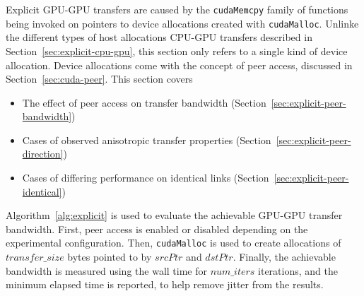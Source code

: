 Explicit GPU-GPU transfers are caused by the \texttt{cudaMemcpy} family of functions being invoked on pointers to device allocations created with \texttt{cudaMalloc}.
Unlinke the different types of host allocations CPU-GPU transfers described in Section~\ref{sec:explicit-cpu-gpu}, this section only refers to a single kind of device allocation.
Device allocations come with the concept of peer access, discussed in Section~\ref{sec:cuda-peer}.
This section covers
\begin{itemize}
\item The effect of peer access on transfer bandwidth (Section~\ref{sec:explicit-peer-bandwidth})
\item Cases of observed anisotropic transfer properties (Section~\ref{sec:explicit-peer-direction})
\item Cases of differing performance on identical links (Section~\ref{sec:explicit-peer-identical})
\end{itemize}

Algorithm~\ref{alg:explicit} is used to evaluate the achievable GPU-GPU transfer bandwidth.
First, peer access is enabled or disabled depending on the experimental configuration.
Then, \texttt{cudaMalloc} is used to create allocations of $transfer\_size$ bytes pointed to by $srcPtr$ and $dstPtr$.
Finally, the achievable bandwidth is measured using the wall time for $num\_iters$ iterations, and the minimum elapsed time is reported, to help remove jitter from the results.

